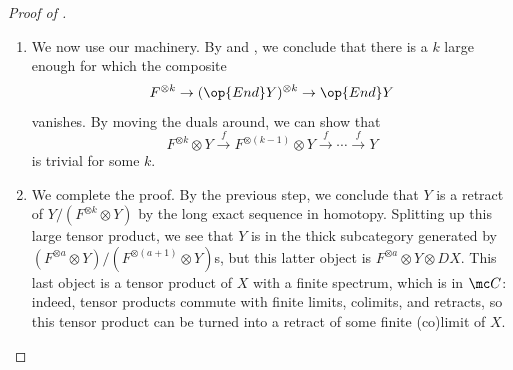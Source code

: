 \documentclass[../notes.tex]{subfiles}
\begin{document}
\begin{proof}[Proof of ]
\begin{enumerate}
		\[F\to\mathbb S_{(p)}\to\op{End}Y\]
		vanishes on $K(m)_*$ for $m\ge n$ still by the previous paragraph. Note that this implies that the composite vanishes on $\FF_{p*}$ as well: $\FF_p$ is some infinite colimit of the $K(m)$s, so because $Y$ is finite, the $\FF_p$-homology will agree with $K(m)$-homology for $m$ large enough.\footnote{This is a little tricky: imagine taking $-\otimes K(m)$, and because $K(m)$ is a field, everything splits, and one can try hard to compute with a spectral sequence.} We also remark that the composite vanishes on $K(m)_*$ for $m<n$ because $K(m)_*Y=0$ for $m<n$ already.
		\item We now use our machinery. By  and , we conclude that there is a $k$ large enough for which the composite
		\[F^{\otimes k}\to(\op{End}Y)^{\otimes k}\to\op{End}Y\]
		vanishes. By moving the duals around, we can show that
		\[F^{\otimes k}\otimes Y\stackrel f\to F^{\otimes(k-1)}\otimes Y\stackrel f\to\cdots\stackrel f\to Y\]
		is trivial for some $k$.
		\item We complete the proof. By the previous step, we conclude that $Y$ is a retract of $Y/(F^{\otimes k}\otimes Y)$ by the long exact sequence in homotopy. Splitting up this large tensor product, we see that $Y$ is in the thick subcategory generated by $(F^{\otimes a}\otimes Y)/(F^{\otimes(a+1)}\otimes Y)$s, but this latter object is $F^{\otimes a}\otimes Y\otimes DX$. This last object is a tensor product of $X$ with a finite spectrum, which is in $\mc C$: indeed, tensor products commute with finite limits, colimits, and retracts, so this tensor product can be turned into a retract of some finite (co)limit of $X$.
		\qedhere
	\end{enumerate}
\end{proof}
\end{document}
